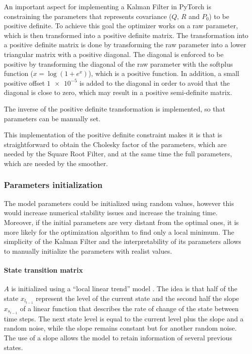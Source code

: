 \documentclass{article}
\begin{document}
An important aspect for implementing a Kalman Filter in PyTorch is constraining the parameters that represents covariance ($Q$, $R$ and $P_0$) to be positive definite. To achieve this goal the optimizer works on a raw parameter, which is then transformed into a positive definite matrix.
The transformation into a positive definite matrix is done by transforming the raw parameter into a lower triangular matrix with a positive diagonal. The diagonal is enforced to be positive by transforming the diagonal of the raw parameter with the softplus function ($x = \log (1 + e^{x})$), which is a positive function.
 In addition, a small positive offset $\num{1e-5}$ is added to the diagonal in order to avoid that the diagonal is close to zero, which may result in a positive semi-definite matrix.

The inverse of the positive definite transformation is implemented, so that parameters can be manually set.

This implementation of the positive definite constraint makes it is that is straightforward to obtain the Cholesky factor of the parameters, which are needed by the Square Root Filter, and at the same time the full parameters, which are needed by the smoother.

\subsubsection{Parameters initialization}

The model parameters could be initialized using random values, however this would increase numerical stability issues and increase the training time. Moreover, if the initial parameters are very distant from the optimal ones, it is more likely for the optimization algorithm to find only a local minimum.  The simplicity of the Kalman Filter and the interpretability of its parameters allows to manually initialize the parameters with realist values.

\paragraph{State transition matrix} $A$ is initialized using a ``local linear trend'' model \cite{durbin_time_2012-1}. The idea is that half of the state $x_{l_{t-1}}$ represent the level of the current state and the second half the slope $x_{s_{t-1}}$ of a linear function that describes the rate of change of the state between time steps. The next state level is equal to the current level plus the slope and a random noise, while the slope remains constant but for another random noise. The use of a slope allows the model to retain information of several previous states.
\end{document}
